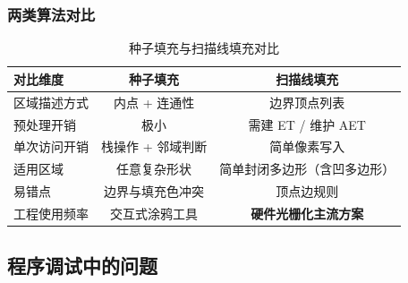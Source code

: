 \documentclass[a4paper,12pt]{ctexart}
\begin{document}
\subsubsection{两类算法对比}

\begin{table}[H]
\centering
\renewcommand{\arraystretch}{1.3}
\begin{tabular}{lcc}
\toprule
对比维度       & 种子填充           & 扫描线填充 \\
\midrule
区域描述方式   & 内点 + 连通性       & 边界顶点列表 \\
预处理开销     & 极小              & 需建 ET / 维护 AET \\
单次访问开销   & 栈操作 + 邻域判断  & 简单像素写入 \\
适用区域       & 任意复杂形状       & 简单封闭多边形（含凹多边形） \\
易错点         & 边界与填充色冲突   & 顶点边规则 \\
工程使用频率   & 交互式涂鸦工具     & \textbf{硬件光栅化主流方案} \\
\bottomrule
\end{tabular}
\caption{种子填充与扫描线填充对比}
\end{table}

\subsection{程序调试中的问题}
\end{document}
